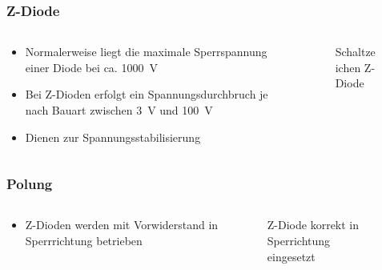 \begin{frame}
\frametitle{Z-Diode}
\begin{columns}
    \begin{column}{0.48\textwidth}
    \begin{itemize}
  \item Normalerweise liegt die maximale Sperrspannung einer Diode bei ca. \qty{1000}{\volt}
  \item Bei Z-Dioden erfolgt ein Spannungsdurchbruch je nach Bauart zwischen \qty{3}{\volt} und \qty{100}{\volt}
  \item Dienen zur Spannungsstabilisierung
  \end{itemize}

    \end{column}
   \begin{column}{0.48\textwidth}
       
\begin{figure}
    \caption{\scriptsize Schaltzeichen Z-Diode}
    \label{_e_z_diode}
\end{figure}


   \end{column}
\end{columns}

\end{frame}

\begin{frame}
\frametitle{Polung}
\begin{columns}
    \begin{column}{0.48\textwidth}
    \begin{itemize}
  \item Z-Dioden werden mit Vorwiderstand in Sperrrichtung betrieben
  \end{itemize}

    \end{column}
   \begin{column}{0.48\textwidth}
       
\begin{figure}
    \caption{\scriptsize Z-Diode korrekt in Sperrichtung eingesetzt}
    \label{e_z_diode_polung}
\end{figure}


   \end{column}
\end{columns}

\end{frame}

